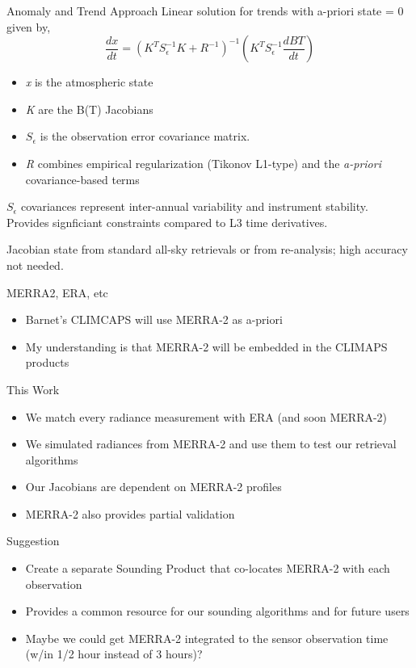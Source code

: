 \documentclass[10pt,t]{beamer}
\begin{document}
\begin{frame}[label={sec:org1286f0e}]{Anomaly and Trend Approach}
Linear solution for trends with a-priori state = 0 given by,
\begin{displaymath}
\frac{dx}{dt} =  \left(K^T S_{\epsilon}^{-1} K + R^{-1}\right)^{-1} \left(K^T S_{\epsilon}^{-1} \frac{dBT}{dt}\right)
\end{displaymath}

\begin{itemize}
\item \emph{x} is the atmospheric state
\item \emph{K} are the B(T) Jacobians
\item \(S_{\epsilon}\) is the observation error covariance matrix.
\item \emph{R} combines empirical regularization (Tikonov L1-type) and the \emph{a-priori} covariance-based terms
\end{itemize}

\(S_\epsilon\) covariances represent inter-annual variability and instrument stability.  Provides signficiant constraints compared to L3 time derivatives.

Jacobian state from standard all-sky retrievals or from re-analysis; high accuracy not needed.
\end{frame}

\begin{frame}[shrink=20,label={sec:org7345407}]{MERRA2, ERA, etc}
\begin{itemize}
\item Barnet's CLIMCAPS will use MERRA-2 as a-priori
\item My understanding is that MERRA-2 will be embedded in the CLIMAPS products
\end{itemize}

\begin{block}{This Work}
\begin{itemize}
\item We match every radiance measurement with ERA (and soon MERRA-2)
\item We simulated radiances from MERRA-2 and use them to test our retrieval algorithms
\item Our Jacobians are dependent on MERRA-2 profiles
\item MERRA-2 also provides partial validation
\end{itemize}
\end{block}

\begin{block}{Suggestion}
\begin{itemize}
\item Create a separate Sounding Product that co-locates MERRA-2 with each observation
\item Provides a common resource for our sounding algorithms and for future users
\item Maybe we could get MERRA-2 integrated to the sensor observation time (w/in 1/2 hour instead of 3 hours)?
\end{itemize}
\end{block}
\end{frame}
\end{document}
